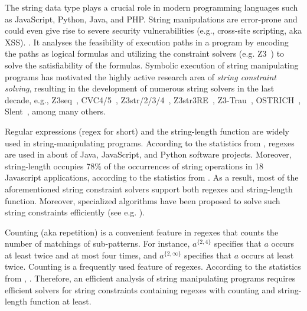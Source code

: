 The string data type plays a crucial role in modern programming languages such as JavaScript, Python, Java, and PHP. 
String manipulations are error-prone and could even give rise to severe security vulnerabilities (e.g., cross-site scripting, aka XSS). 
.
It analyses the feasibility of execution paths in a program by encoding the paths as logical formulas and utilizing the constraint solvers (e.g. Z3~\cite{Z3}) to solve the satisfiability of the formulas. 
%
Symbolic execution of string manipulating programs has motivated the highly active research area of \emph{string constraint solving}, resulting in the development of numerous string solvers in the last decade, e.g.,
Z3seq~\cite{z3seq}, CVC4/5~\cite{cvc4,cvc5}, Z3str/2/3/4~\cite{Z3-str,Z3-str2,Z3-str3,BerzishMurphy2021}, Z3str3RE~\cite{BD+23}, 
Z3-Trau~\cite{Z3-trau}\cite{z3trau}, OSTRICH~\cite{CHL+19}, Slent~\cite{WC+18}, among many others. 

Regular expressions (regex for short) and the string-length function are widely used in string-manipulating programs. According to the statistics
from \cite{CS16,DCSL18,WS18}, regexes are used in about  of Java, JavaScript, and Python software projects. Moreover, string-length occupies 78\% of the occurrences of string operations in 18 Javascript applications, according to the statistics from \cite{malware_detection_3_kudzu}. As a result, most of the aforementioned string constraint solvers support both regexes and string-length function. Moreover, specialized algorithms have been proposed to solve such string constraints efficiently (see e.g. \cite{LTR+15,BD+23}).

Counting (aka repetition) is a convenient feature in regexes that counts the number of matchings of sub-patterns. For instance, $a^{\{2, 4\}}$ specifies that $a$ occurs at least twice and at most four times, and $a^{\{2, \infty\}}$ specifies that $a$ occurs at least twice. 
Counting is a frequently used feature of regexes. According to the statistics from \cite{CS16}, . Therefore, an efficient analysis of string manipulating programs requires efficient solvers for string constraints containing regexes with counting and string-length function at least. 

